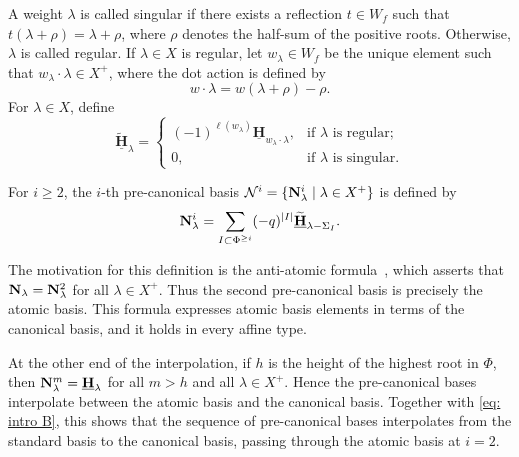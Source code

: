 A weight $\lambda$ is called singular if there exists a reflection $t\in W_f$ such that $t(\lambda+\rho)=\lambda+\rho$, where $\rho$ denotes the half-sum of the positive roots. Otherwise, $\lambda$ is called regular. If $\lambda\in X$ is regular, let $w_\lambda\in W_f$ be the unique element such that $w_\lambda\cdot \lambda\in X^+$, where the dot action is defined by
\[
    w\cdot \lambda=w(\lambda+\rho)-\rho.
\]
For $\lambda\in X$, define
\begin{equation}  \label{tilde de schur}
    \widetilde{\underline{\mathbf{H}}}_\lambda = \begin{cases}
        (-1)^{\ell (w_{\lambda})} \underline{\mathbf{H}}_{w_{\lambda}\cdot \lambda}, & \mbox{if } \lambda \mbox{ is regular;}\\
        0, & \mbox{if } \lambda \mbox{ is singular.}
    \end{cases}
\end{equation}

\begin{definition}\rm \label{defi pre-canonical}
For $i\geq 2$, the $i$-th pre-canonical basis $\mathcal{N}^{i}=\{\mathbf{N}_{\lambda }^i\mid \lambda\in X^{+}\}$ is defined by
\begin{equation}  \label{def: pre-canonical}
    \mathbf{N}_{\lambda}^{i} = \sum_{I\subset \Phi^{\geq i}} (-q)^{|I|} \widetilde{\underline{\mathbf{H}}}_{\lambda - \Sigma_I}.
\end{equation}  
\end{definition}

The motivation for this definition is the anti-atomic formula~\cite[Theorem 3.1]{LPP}, which asserts that $\mathbf{N}_\lambda=\mathbf{N}_\lambda^2$ for all $\lambda\in X^+$. Thus the second pre-canonical basis is precisely the atomic basis. This formula expresses atomic basis elements in terms of the canonical basis, and it holds in every affine type.

At the other end of the interpolation, if $h$ is the height of the highest root in $\Phi$, then $\mathbf{N}_\lambda^{m}=\underline{\mathbf{H}}_\lambda$ for all $m>h$ and all $\lambda\in X^+$. Hence the pre-canonical bases interpolate between the atomic basis and the canonical basis. %
Together with \eqref{eq: intro B}, this shows that the sequence of pre-canonical bases interpolates from the standard basis to the canonical basis, passing through the atomic basis at $i=2$.

